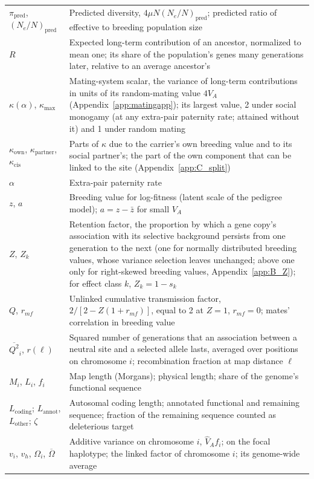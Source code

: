 \documentclass{article}
\begin{document}
\begin{longtable}{l>{\raggedright\arraybackslash}p{}}
$\pi_\text{pred}$, $(N_e/N)_\text{pred}$ & Predicted diversity, $4\mu N(N_e/N)_\text{pred}$; predicted ratio of effective to breeding population size \\
$R$ & Expected long-term contribution of an ancestor, normalized to mean one; its share of the population's genes many generations later, relative to an average ancestor's \\
$\kappa(\alpha)$, $\kappa_\text{max}$ & Mating-system scalar, the variance of long-term contributions in units of its random-mating value $4V_A$ (Appendix~\ref{app:matingapp}); its largest value, 2 under social monogamy (at any extra-pair paternity rate; attained without it) and 1 under random mating \\
$\kappa_\text{own}$, $\kappa_\text{partner}$, $\kappa_\text{cis}$ & Parts of $\kappa$ due to the carrier's own breeding value and to its social partner's; the part of the own component that can be linked to the site (Appendix~\ref{app:C_split}) \\
$\alpha$ & Extra-pair paternity rate \\
$z$, $a$ & Breeding value for log-fitness (latent scale of the pedigree model); $a = z - \bar{z}$ for small $V_A$ \\
$Z$, $Z_k$ & Retention factor, the proportion by which a gene copy's association with its selective background persists from one generation to the next (one for normally distributed breeding values, whose variance selection leaves unchanged; above one only for right-skewed breeding values, Appendix~\ref{app:B_Z}); for effect class $k$, $Z_k = 1 - s_k$ \\
$Q$, $r_{mf}$ & Unlinked cumulative transmission factor, $2/[2 - Z(1+r_{mf})]$, equal to 2 at $Z = 1$, $r_{mf} = 0$; mates' correlation in breeding value \\
$\overline{Q^2}_i$, $r(\ell)$ & Squared number of generations that an association between a neutral site and a selected allele lasts, averaged over positions on chromosome $i$; recombination fraction at map distance $\ell$ \\
$M_i$, $L_i$, $f_i$ & Map length (Morgans); physical length; share of the genome's functional sequence \\
$L_\text{coding}$; $L_\text{annot}$, $L_\text{other}$; $\zeta$ & Autosomal coding length; annotated functional and remaining sequence; fraction of the remaining sequence counted as deleterious target \\
$v_i$, $v_h$, $\Omega_i$, $\overline{\Omega}$ & Additive variance on chromosome $i$, $\hat{V}_A f_i$; on the focal haplotype; the linked factor of chromosome $i$; its genome-wide average \\

\end{longtable}
\end{document}
